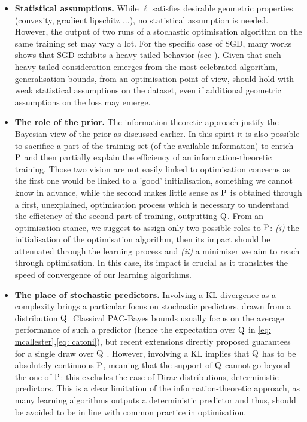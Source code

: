 \begin{itemize}
  \item \textbf{Statistical assumptions.} While $\ell$ satisfies desirable geometric properties (convexity, gradient lipschitz ...), no statistical assumption is needed. However, the output of two runs of a stochastic optimisation algorithm on the same training set may vary a lot.  For the specific case of SGD, many works shows that SGD exhibits a heavy-tailed behavior (see \eg \citealp{simsekli2019tail,zhang2020adaptive,gurbuzbalaban2020heavy}). Given that such heavy-tailed consideration emerges from the most celebrated algorithm, generalisation bounds, from an optimisation point of view, should hold with weak statistical assumptions on the dataset, even if additional geometric assumptions on the loss may emerge.
  \item \textbf{The role of the prior.} The information-theoretic approach justify the Bayesian view of the prior as discussed earlier. In this spirit it is also possible to sacrifice a part of the training set (\ie of the available information) to enrich $\P$ and then partially explain the efficiency of an information-theoretic training.  Those two vision are not easily linked to optimisation concerns as the first one would be linked to a 'good' initialisation, something we cannot know in advance, while the second makes little sense as $\P$ is obtained through a first, unexplained, optimisation process which is necessary to understand the efficiency of the second part of training, outputting $\Q$. From an optimisation stance, we suggest to assign only two possible roles to $\P$: \textit{(i)} the initialisation of the optimisation algorithm, then its impact should be attenuated through the learning process and \textit{(ii)} a minimiser we aim to reach through optimisation. In this case, its impact is crucial as it translates the speed of convergence of our learning algorithms.
  \item \textbf{The place of stochastic predictors.} Involving a KL divergence as a complexity brings a particular focus on stochastic predictors, drawn from a distribution $\Q$. Classical PAC-Bayes bounds usually focus on the average performance of such a predictor (hence the expectation over $\Q$ in \eqref{eq: mcallester},\eqref{eq: catoni}), but recent extensions directly proposed guarantees for a single draw over $\Q$ \citep{rivasplata2020pac,viallard2023general}. However, involving a KL implies that $\Q$ has to be absolutely continuous \wrt $\P$,  meaning that the support of $\Q$ cannot go beyond the one of $\P$: this excludes the case of Dirac distributions, \ie deterministic predictors. This is a clear limitation of the information-theoretic approach, as many learning algorithms outputs a deterministic predictor and thus, should be avoided to be in line with common practice in optimisation.
\end{itemize}

